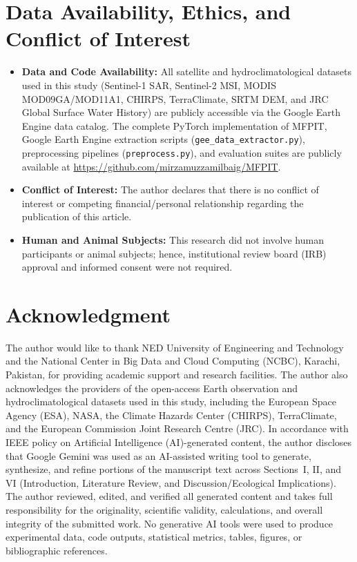 \documentclass[journal]{IEEEtran}
\begin{document}
\section*{Data Availability, Ethics, and Conflict of Interest}
\begin{itemize}
    \item \textbf{Data and Code Availability:} All satellite and hydroclimatological datasets used in this study (Sentinel-1 SAR, Sentinel-2 MSI, MODIS MOD09GA/MOD11A1, CHIRPS, TerraClimate, SRTM DEM, and JRC Global Surface Water History) are publicly accessible via the Google Earth Engine data catalog. The complete PyTorch implementation of MFPIT, Google Earth Engine extraction scripts (\texttt{gee\_data\_extractor.py}), preprocessing pipelines (\texttt{preprocess.py}), and evaluation suites are publicly available at \url{https://github.com/mirzamuzzamilbaig/MFPIT}.
    \item \textbf{Conflict of Interest:} The author declares that there is no conflict of interest or competing financial/personal relationship regarding the publication of this article.
    \item \textbf{Human and Animal Subjects:} This research did not involve human participants or animal subjects; hence, institutional review board (IRB) approval and informed consent were not required.
\end{itemize}

\section*{Acknowledgment}
The author would like to thank NED University of Engineering and Technology and the National Center in Big Data and Cloud Computing (NCBC), Karachi, Pakistan, for providing academic support and research facilities. The author also acknowledges the providers of the open-access Earth observation and hydroclimatological datasets used in this study, including the European Space Agency (ESA), NASA, the Climate Hazards Center (CHIRPS), TerraClimate, and the European Commission Joint Research Centre (JRC). In accordance with IEEE policy on Artificial Intelligence (AI)-generated content, the author discloses that Google Gemini was used as an AI-assisted writing tool to generate, synthesize, and refine portions of the manuscript text across Sections~I, II, and VI (Introduction, Literature Review, and Discussion/Ecological Implications). The author reviewed, edited, and verified all generated content and takes full responsibility for the originality, scientific validity, calculations, and overall integrity of the submitted work. No generative AI tools were used to produce experimental data, code outputs, statistical metrics, tables, figures, or bibliographic references.
\end{document}

